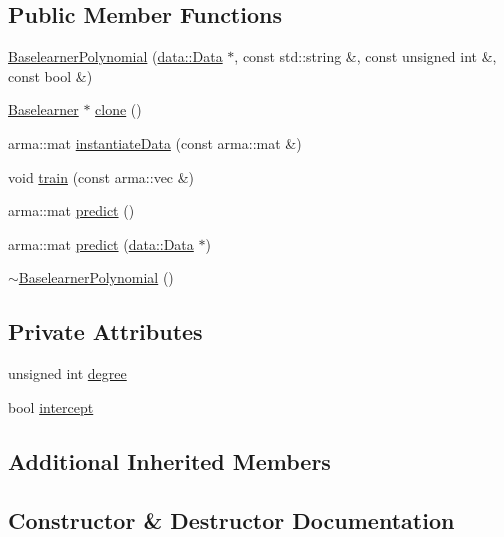 \subsection*{Public Member Functions}
\begin{DoxyCompactItemize}
\item 
\hyperlink{classblearner_1_1_baselearner_polynomial_aba0f1e5bf9566dc7bc674c9d30b44af6}{Baselearner\+Polynomial} (\hyperlink{classdata_1_1_data}{data\+::\+Data} $\ast$, const std\+::string \&, const unsigned int \&, const bool \&)
\item 
\hyperlink{classblearner_1_1_baselearner}{Baselearner} $\ast$ \hyperlink{classblearner_1_1_baselearner_polynomial_a4afd811448bd6d387b721cc48b84da26}{clone} ()
\item 
arma\+::mat \hyperlink{classblearner_1_1_baselearner_polynomial_aacd6ba3b09ccf63a96d7bffa1d703710}{instantiate\+Data} (const arma\+::mat \&)
\item 
void \hyperlink{classblearner_1_1_baselearner_polynomial_af8bc28904ebce13e78d0e4a361725f26}{train} (const arma\+::vec \&)
\item 
arma\+::mat \hyperlink{classblearner_1_1_baselearner_polynomial_ad45b97c416ac06755c617b671cfbdb76}{predict} ()
\item 
arma\+::mat \hyperlink{classblearner_1_1_baselearner_polynomial_a8aee40269b2b4dabdd81cebe5b4f2488}{predict} (\hyperlink{classdata_1_1_data}{data\+::\+Data} $\ast$)
\item 
\hyperlink{classblearner_1_1_baselearner_polynomial_abb799eceb2808fcca4c8041e2ae7abe4}{$\sim$\+Baselearner\+Polynomial} ()
\end{DoxyCompactItemize}
\subsection*{Private Attributes}
\begin{DoxyCompactItemize}
\item 
unsigned int \hyperlink{classblearner_1_1_baselearner_polynomial_a6841e90a66b12f3f345f6e563df78baf}{degree}
\item 
bool \hyperlink{classblearner_1_1_baselearner_polynomial_af72326177abcf1fae10a32f9dfdd6a6e}{intercept}
\end{DoxyCompactItemize}
\subsection*{Additional Inherited Members}


\subsection{Constructor \& Destructor Documentation}
\mbox{\label{classblearner_1_1_baselearner_polynomial_aba0f1e5bf9566dc7bc674c9d30b44af6}} 
